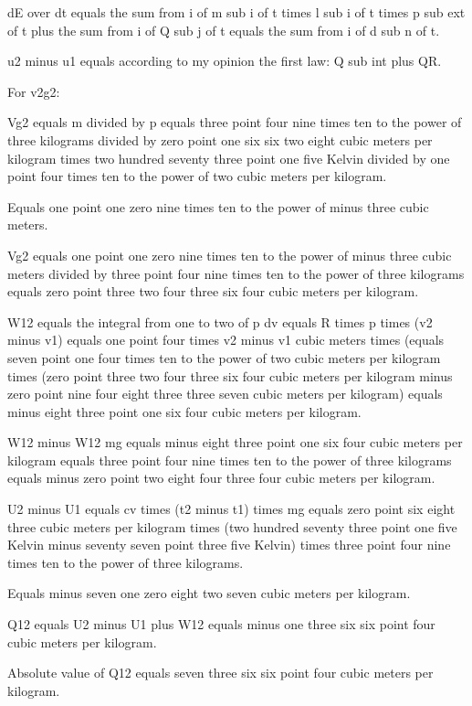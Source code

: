 dE over dt equals the sum from i of m sub i of t times l sub i of t times p sub ext of t plus the sum from i of Q sub j of t equals the sum from i of d sub n of t.

u2 minus u1 equals according to my opinion the first law: Q sub int plus QR.

For v2g2:

Vg2 equals m divided by p equals three point four nine times ten to the power of three kilograms divided by zero point one six six two eight cubic meters per kilogram times two hundred seventy three point one five Kelvin divided by one point four times ten to the power of two cubic meters per kilogram.

Equals one point one zero nine times ten to the power of minus three cubic meters.

Vg2 equals one point one zero nine times ten to the power of minus three cubic meters divided by three point four nine times ten to the power of three kilograms equals zero point three two four three six four cubic meters per kilogram.

W12 equals the integral from one to two of p dv equals R times p times (v2 minus v1) equals one point four times v2 minus v1 cubic meters times (equals seven point one four times ten to the power of two cubic meters per kilogram times (zero point three two four three six four cubic meters per kilogram minus zero point nine four eight three three seven cubic meters per kilogram) equals minus eight three point one six four cubic meters per kilogram.

W12 minus W12 mg equals minus eight three point one six four cubic meters per kilogram equals three point four nine times ten to the power of three kilograms equals minus zero point two eight four three four cubic meters per kilogram.

U2 minus U1 equals cv times (t2 minus t1) times mg equals zero point six eight three cubic meters per kilogram times (two hundred seventy three point one five Kelvin minus seventy seven point three five Kelvin) times three point four nine times ten to the power of three kilograms.

Equals minus seven one zero eight two seven cubic meters per kilogram.

Q12 equals U2 minus U1 plus W12 equals minus one three six six point four cubic meters per kilogram.

Absolute value of Q12 equals seven three six six point four cubic meters per kilogram.